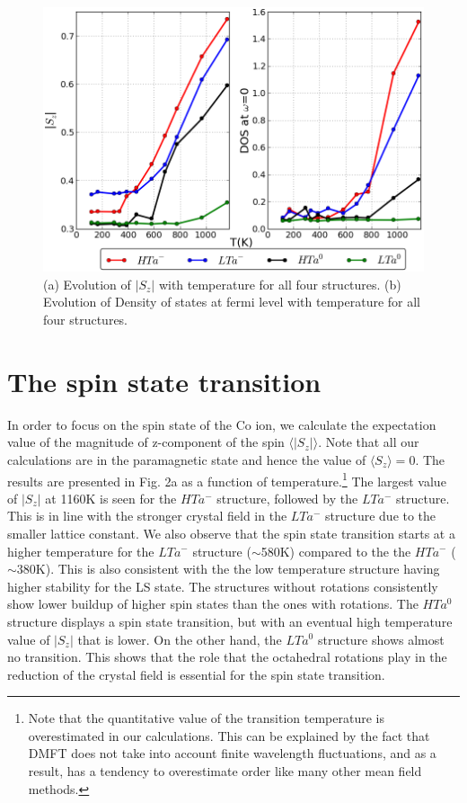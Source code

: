 \documentclass[10pt]{ruthesis}
\begin{document}
{\begin{figure}
\begin{center}
\includegraphics[width=\columnwidth]{plots_final/output/fig2.png}
\caption{(a) Evolution of $|S_z|$ with temperature for all four structures. (b) Evolution of Density of states at fermi level with temperature for all four structures.}
\end{center}
\end{figure}

\section{The spin state transition} 
In order to focus on the spin state of the Co ion, we calculate the expectation value of the magnitude of z-component of the spin $\langle|S_z|\rangle$. Note that all our calculations are in the paramagnetic state and hence the value of $\langle S_z \rangle=0$. The results are presented in Fig. 2a as a function of temperature.\footnote{Note that the quantitative value of the transition temperature is overestimated in our calculations. This can be explained by the fact that DMFT does not take into account finite wavelength fluctuations, and as a result, has a tendency to overestimate order like many other mean field methods.} 
The largest value of $|S_z|$ at 1160K is seen for the $HTa^-$ structure, followed by the $LTa^-$ structure. 
%
This is in line with the stronger crystal field in the $LTa^-$ structure due to the smaller lattice constant.
We also observe that  the spin state transition starts at a higher temperature for the $LTa^-$ structure ($\sim$580K) compared to the the $HTa^-$ ($\sim$380K). This is also consistent with the the low temperature structure having higher stability for the LS state. 
The structures without rotations consistently show lower buildup of higher spin states than the ones with rotations. The $HTa^0$ structure displays a spin state transition, but with an eventual high temperature value of $|S_z|$ that is lower. On the other hand, the $LTa^0$ structure shows almost no transition. This shows that the role that the octahedral rotations play in the reduction of the crystal field is essential for the spin state transition.

}
\end{document}
